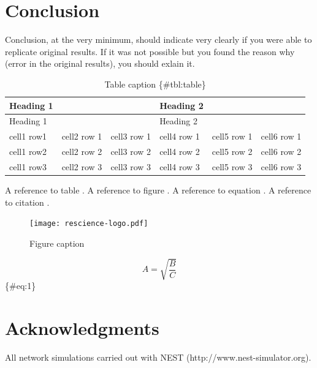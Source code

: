 \documentclass[10pt,a4paper,onecolumn]{article}
\begin{document}
\section{Conclusion}\label{conclusion}

Conclusion, at the very minimum, should indicate very clearly if you
were able to replicate original results. If it was not possible but you
found the reason why (error in the original results), you should exlain
it.

\begin{longtable}[]{@{}llllll@{}}
\caption{Table caption \{\#tbl:table\}}\tabularnewline
\toprule
Heading 1 & & & Heading 2 & &\tabularnewline
\midrule
\endfirsthead
\toprule
Heading 1 & & & Heading 2 & &\tabularnewline
\midrule
\endhead
cell1 row1 & cell2 row 1 & cell3 row 1 & cell4 row 1 & cell5 row 1 &
cell6 row 1\tabularnewline
cell1 row2 & cell2 row 2 & cell3 row 2 & cell4 row 2 & cell5 row 2 &
cell6 row 2\tabularnewline
cell1 row3 & cell2 row 3 & cell3 row 3 & cell4 row 3 & cell5 row 3 &
cell6 row 3\tabularnewline
\bottomrule
\end{longtable}

A reference to table \textcite{tbl:table}. A reference to figure
\textcite{fig:logo}. A reference to equation \textcite{eq:1}. A
reference to citation \textcite{markdown}.

\begin{figure}
\centering
\texttt{[image: rescience-logo.pdf]}
\caption{Figure caption}\label{fig:logo}
\end{figure}

\[ A = \sqrt{\frac{B}{C}} \] \{\#eq:1\}

\section{Acknowledgments}\label{acknowledgments}

All network simulations carried out with NEST
(http://www.nest-simulator.org).

{\sffamily \small
  \printbibliography[title=References]
}
\end{document}
